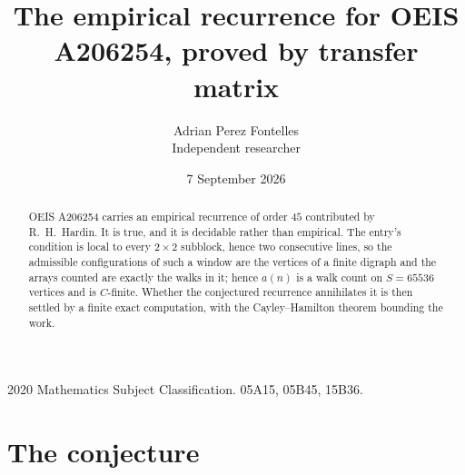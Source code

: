 \documentclass[11pt,a4paper]{article}
\title{The empirical recurrence for OEIS A206254, proved by transfer matrix}
\author{Adrian Perez Fontelles\\ \small Independent researcher}
\date{7 September 2026}
\theoremstyle{plain}
\theoremstyle{definition}
\begin{document}
\maketitle

\begin{abstract}
OEIS A206254 carries an empirical recurrence of order $45$ contributed by R.~H.~Hardin. It is
true, and it is decidable rather than empirical. The entry's condition is local to every $2\times2$ subblock, hence two consecutive lines, so
the admissible configurations of such a window are the vertices of a finite digraph and the
arrays counted are exactly the walks in it; hence $a(n)$ is a walk count on $S=65536$ vertices
and is $C$-finite. Whether the conjectured recurrence annihilates it is then settled by a
finite exact computation, with the Cayley--Hamilton theorem bounding the work.
\end{abstract}

\noindent\small 2020 Mathematics Subject Classification. 05A15, 05B45, 15B36.\normalsize

\section{The conjecture}
\end{document}
